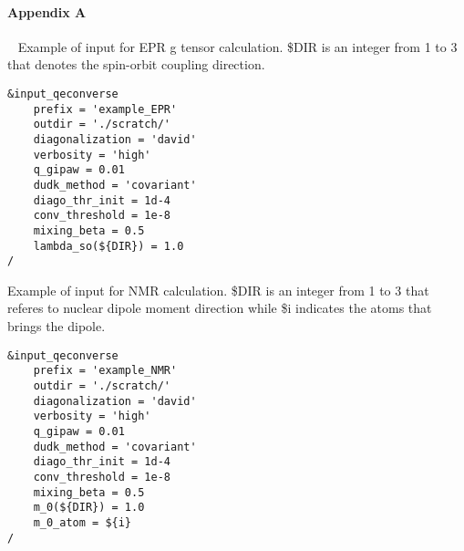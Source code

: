\documentclass[final,3p,times,twocolumn]{elsarticle}
\begin{document}
\begin{small}
\paragraph{\textbf{Appendix A}} \ 
\vskip 0.5cm
\noindent
Example of input for EPR g tensor calculation. {\selectfont
\${DIR}} is an integer from 1 to 3 that denotes the spin-orbit coupling direction. 
\begin{verbatim}
&input_qeconverse
    prefix = 'example_EPR'
    outdir = './scratch/'
    diagonalization = 'david'
    verbosity = 'high'
    q_gipaw = 0.01
    dudk_method = 'covariant'
    diago_thr_init = 1d-4
    conv_threshold = 1e-8
    mixing_beta = 0.5
    lambda_so(${DIR}) = 1.0
/
\end{verbatim}
\vskip 0.5cm
Example of input for NMR calculation. {\selectfont
\${DIR}} is an integer from 1 to 3 that referes to nuclear dipole moment direction while {\selectfont
\${i}} indicates the atoms that brings the dipole.
\begin{verbatim}
&input_qeconverse
    prefix = 'example_NMR'
    outdir = './scratch/'
    diagonalization = 'david'
    verbosity = 'high'
    q_gipaw = 0.01
    dudk_method = 'covariant'
    diago_thr_init = 1d-4
    conv_threshold = 1e-8
    mixing_beta = 0.5
    m_0(${DIR}) = 1.0
    m_0_atom = ${i}
/
\end{verbatim}
\end{small}














\end{document}
